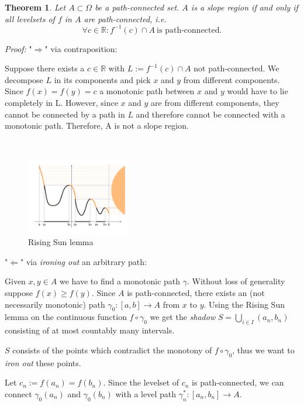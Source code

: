 \documentclass[a4paper,12pt,notitlepage,fullpage]{paper}
\theoremstyle{plain}
\newtheorem{thm}{Theorem}[section] %
\theoremstyle{definition}
\begin{document}
\begin{thm}
\label{slope_iff_conn_lvlsets}
Let $A \subset \Omega$ be a path-connected set.
$A$ is a slope region if and only if all levelsets of $f$ in $A$ are path-connected, i.e.
\begin{equation*}
\forall c \in \mathbb{R}: f^{-1}(c) \cap A ~ \text{is path-connected}.
\end{equation*}
\end{thm}

\emph{Proof:} "$\Rightarrow$" via contraposition:

Suppose there exists a $c \in \mathbb{R}$ with $L := f^{-1}(c) \cap A$ not path-connected.
We decompose $L$ in its components and pick $x$ and $y$ from different components.
Since $f(x) = f(y) = c$ a monotonic path between $x$ and $y$ would have to lie completely in L.
However, since $x$ and $y$ are from different components, they cannot be connected by a path in $L$ and therefore cannot be connected with a monotonic path.
Therefore, A is not a slope region.

$~$

\begin{figure}
\centering
\includegraphics[width=0.4\textwidth]{img/Rising_sun_lemma.png}
\caption{Rising Sun lemma}
\label{fig:lemma_1}
\end{figure}

"$\Leftarrow$" via \emph{ironing out} an arbitrary path:

Given $x, y \in A$ we have to find a monotonic path $\gamma$.
Without loss of generality suppose $f(x) \geq f(y)$.
Since $A$ is path-connected, there exists an (not necessarily monotonic) path $\gamma_0: [a,b] \to A$ from $x$ to $y$.
Using the Rising Sun lemma \cite{grill} on the continuous function $f \circ \gamma_0$ we get the \emph{shadow} $S = \bigcup_{i \in I} (a_n, b_n)$ consisting of at most countably many intervals.

$S$ consists of the points which contradict the monotony of $f \circ \gamma_0$, thus we want to \emph{iron out} these points.

Let $c_n := f(a_n) = f(b_n)$. Since the levelset of $c_n$ is path-connected, we can connect $\gamma_0(a_n)$ and $\gamma_0(b_n)$ with a level path $\gamma_n^* : [a_n, b_n] \to A.$
\end{document}
